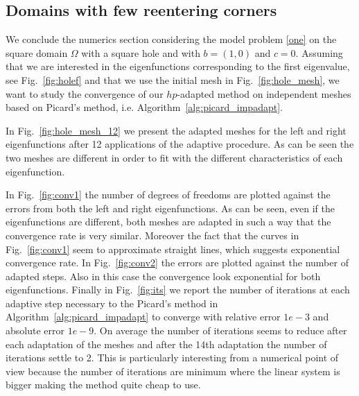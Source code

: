 \documentclass[smallextended]{svjour3}
\begin{document}
\subsection{Domains with few reentering corners}\label{ssec:reent}

We conclude the numerics section considering the model problem \eqref{one} on the square domain $\Omega$ with a square hole and with $b=(1,0)$ and $c=0$. Assuming that we are interested in the eigenfunctions corresponding to the first eigenvalue, see Fig.~\ref{fig:holef} and that we use the initial mesh in Fig.~\ref{fig:hole_mesh}, we want to study the convergence of our $hp$-adapted method on independent meshes based on Picard's method, i.e. Algorithm~\ref{alg:picard_impadapt}.

In Fig.~\ref{fig:hole_mesh_12} we present the adapted meshes for the left and right eigenfunctions after 12 applications of the adaptive procedure. As can be seen the two meshes are different in order to fit with the different characteristics of each eigenfunction.

In Fig.~\ref{fig:conv1} the number of degrees of freedoms are plotted against the errors from both the left and right eigenfunctions. As can be seen, even if the eigenfunctions are different, both meshes are adapted in such a way that the convergence rate is very similar. Moreover the fact that the curves in Fig.~\ref{fig:conv1} seem to approximate straight lines, which suggests exponential convergence rate. In Fig.~\ref{fig:conv2} the errors are plotted against the number of adapted steps. Also in this case the convergence look exponential for both eigenfunctions.
Finally in Fig.~\ref{fig:its} we report the number of iterations at each adaptive step necessary to the Picard's method in Algorithm~\ref{alg:picard_impadapt} to converge with relative error $1e-3$ and absolute error $1e-9$.
On average the number of iterations seems to reduce after each adaptation of the meshes and after the 14th adaptation the number of iterations settle to 2. This is particularly interesting from a numerical point of view because the number of iterations are minimum where the linear system is bigger making the method quite cheap to use.
\end{document}
